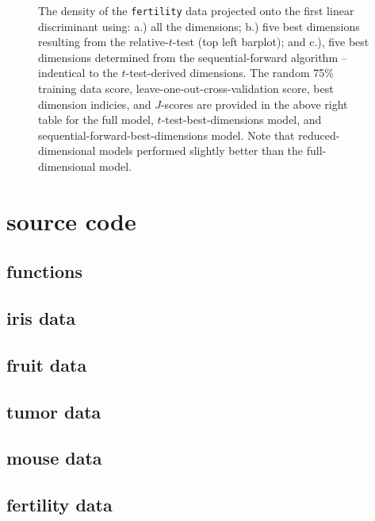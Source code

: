\begin{figure}[H]
\begin{minipage}[t]{1.00\linewidth}
  \end{minipage}
  \caption{The density of the \texttt{fertility} data projected onto the first linear discriminant using: a.) all the dimensions; b.) five best dimensions resulting from the relative-$t$-test (top left barplot); and c.), five best dimensions determined from the sequential-forward algorithm -- indentical to the $t$-test-derived dimensions.  The random 75\% training data score, leave-one-out-cross-validation score, best dimension indicies, and $J$-scores are provided in the above right table for the full model, $t$-test-best-dimensions model, and sequential-forward-best-dimensions model.   Note that reduced-dimensional models performed slightly better than the full-dimensional model.}
\end{figure}

\newpage

\section{source code}

\begin{multicols}{2}

\subsection{functions}


\subsection{iris data}


\subsection{fruit data}


\subsection{tumor data}


\subsection{mouse data}


\subsection{fertility data}



\end{multicols}






